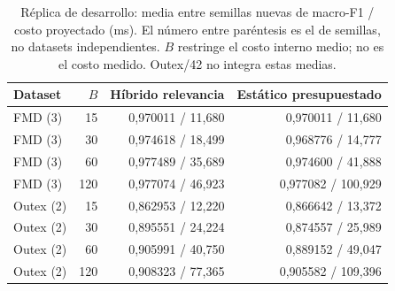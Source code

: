 \begin{table}[!htbp]\centering\small
\caption{Réplica de desarrollo: media entre semillas nuevas de macro-F1 / costo proyectado (ms). El número entre paréntesis es el de semillas, no datasets independientes. $B$ restringe el costo interno medio; no es el costo medido. Outex/42 no integra estas medias.}
\label{tab:replica-medias}
\begin{tabular}{@{}lrrr@{}}
\toprule
Dataset & $B$ & Híbrido relevancia & Estático presupuestado\\
\midrule
FMD (3) & 15 & 0,970011 / 11,680 & 0,970011 / 11,680\\
FMD (3) & 30 & 0,974618 / 18,499 & 0,968776 / 14,777\\
FMD (3) & 60 & 0,977489 / 35,689 & 0,974600 / 41,888\\
FMD (3) & 120 & 0,977074 / 46,923 & 0,977082 / 100,929\\
Outex (2) & 15 & 0,862953 / 12,220 & 0,866642 / 13,372\\
Outex (2) & 30 & 0,895551 / 24,224 & 0,874557 / 25,989\\
Outex (2) & 60 & 0,905991 / 40,750 & 0,889152 / 49,047\\
Outex (2) & 120 & 0,908323 / 77,365 & 0,905582 / 109,396\\
\bottomrule
\end{tabular}
\end{table}
